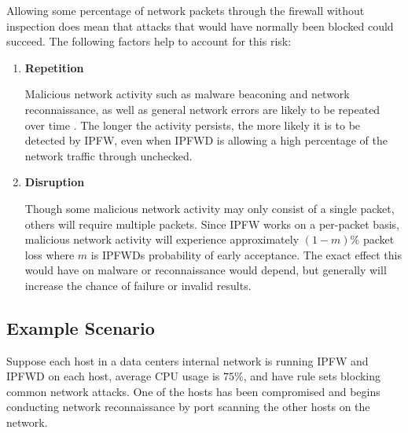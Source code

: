 \documentclass[journal]{IEEEtran}
\begin{document}
  Allowing some percentage of network packets through the firewall without
  inspection does mean that attacks that would have normally been blocked could
  succeed. The following factors help to account for this risk:

  \begin{enumerate}

    \item \textbf{Repetition} 

      Malicious network activity such as malware beaconing and network
      reconnaissance, as well as general network errors are likely to be
      repeated over time \cite{beacondetection}. The longer the activity
      persists, the more likely it is to be detected by IPFW, even when IPFWD
      is allowing a high percentage of the network traffic through unchecked.

    \item \textbf{Disruption} 

      Though some malicious network activity may only consist of a single
      packet, others will require multiple packets. Since IPFW works on a
      per-packet basis, malicious network activity will experience
      approximately $(1 - m)\%$ packet loss where $m$ is IPFWDs probability of early
      acceptance. The exact effect this would have on malware or reconnaissance
      would depend, but generally will increase the chance of failure or
      invalid results.

  \end{enumerate}



  \subsection{Example Scenario} 

    Suppose each host in a data centers internal network is running IPFW and
    IPFWD on each host, average CPU usage is $75\%$, and have rule sets
    blocking common network attacks. One of the hosts has been compromised and
    begins conducting network reconnaissance by port scanning the other hosts
    on the network. 
\end{document}
